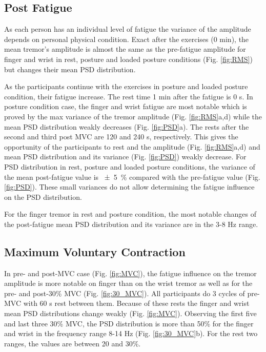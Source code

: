 \documentclass[conference, a4paper]{IEEEtran}
\begin{document}
\subsection{Post Fatigue}

As each person has an individual level of fatigue the variance of the amplitude depends on personal physical condition. Exact after the exercises (0 min), the mean tremor's amplitude is almost the same as the pre-fatigue amplitude for finger and wrist in rest, posture and loaded posture conditions (Fig. \ref{fig:RMS}) but changes their mean PSD distribution.

As the participants continue with the exercises in posture and loaded posture condition, their fatigue increase. The rest time 1 min after the fatigue is 0 s. In posture condition case, the finger and wrist fatigue are most notable which is proved by the max variance of the tremor amplitude (Fig. \ref{fig:RMS}a,d) while the mean PSD distribution weakly decreases (Fig. \ref{fig:PSD}a).  The rests after the second and third post MVC are 120 and 240 s, respectively. This gives the opportunity of the participants to rest and the amplitude (Fig. \ref{fig:RMS}a,d) and mean PSD distribution and its variance (Fig. \ref{fig:PSD}) weakly decrease.
For PSD distribution in rest, posture and loaded posture conditions, the variance of the mean post-fatigue value is \SI{\pm 5}{\percent} compared with the pre-fatigue value (Fig. \ref{fig:PSD}). These small variances do not allow determining the fatigue influence on the PSD distribution.

For the finger tremor in rest and posture condition, the most notable changes of the post-fatigue mean PSD distribution and its variance are in the 3-8 Hz range.

%
\subsection{Maximum Voluntary Contraction}

In pre- and post-MVC case (Fig. \ref{fig:MVC}), the fatigue influence on the tremor amplitude is more notable on finger than on the wrist tremor as well as for the pre- and post-30\% MVC (Fig. \ref{fig:30_MVC}).
All participants do 3 cycles of pre-MVC with 60 s rest between them. Because of these rests the finger and wrist mean PSD distributions change weakly (Fig. \ref{fig:MVC}).
Observing the first five and last three 30\% MVC, the PSD distribution is more than 50\% for the finger and wrist in the frequency range 8-14 Hz (Fig. \ref{fig:30_MVC}b). For the rest two ranges, the values are between 20 and 30\%.
\end{document}
